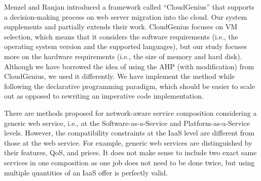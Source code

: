 Menzel and Ranjan introduced a framework called
“CloudGenius” \cite{CloudGenius} that supports a decision-making process on web
server migration into the cloud. Our system supplements and
partially extends their work. CloudGenius \cite{CloudGenius} focuses on
VM selection, which means that it considers the software requirements
(i.e., the operating system version and the supported
languages), but our study focuses more on the hardware requirements
(i.e., the size of memory and hard disk). Although we
have borrowed the idea of using the AHP (with modification) from CloudGenius,
we used it differently. We have implement the method while following the declarative programming
paradigm, which should be easier to scale out as opposed to rewriting an imperative code implementation.

There are methods proposed for network-aware service composition
\cite{Yu2007, Benatallah2004, Zheng2013}
considering a generic web service, i.e., at the
Software-as-a-Service and Platform-as-a-Service levels. However,
the compatibility constraints at the IaaS level are different
from those at the web service. For example, generic web
services are distinguished by their features, QoS, and prices.
It does not make sense to include two exact same services in
one composition as one job does not need to be done twice, but
using multiple quantities of an IaaS offer is perfectly valid.
